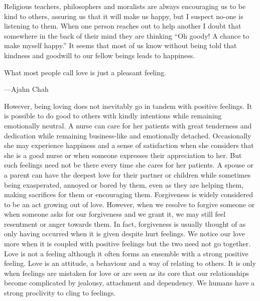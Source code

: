 \documentclass[10pt, openright]{book}
\newenvironment{epigram-2}%
{%
\vspace{1em}
\noindent
\quoting[leftmargin=2.5cm,rightmargin=2.5cm]%
\begin{itshape}
\large
}%
{\end{itshape}\endquoting
}%
\newenvironment{epigram-2-cite}%
{%
\quoting[leftmargin=2.5cm,rightmargin=2.5cm]%
\noindent\normal\hspace*{\fill} 
}%
{\endquoting\vspace{1em}
}%
\begin{document}
Religious teachers, philosophers and moralists are always encouraging us to be kind to others, assuring us that it will make us happy, but I suspect no-one is listening to them. When one person reaches out to help another I doubt that somewhere in the back of their mind they are thinking “Oh goody! A chance to make myself happy.” It seems that most of us know without being told that kindness and goodwill to our fellow beings leads to happiness.


\begin{epigram-2}
What most people call love is just a pleasant feeling.
\end{epigram-2}

\begin{epigram-2-cite}
—Ajahn Chah
\end{epigram-2-cite}

However, being loving does not inevitably go in tandem with positive feelings. It is possible to do good to others with kindly intentions while remaining emotionally neutral. A nurse can care for her patients with great tenderness and dedication while remaining business-like and emotionally detached. Occasionally she may experience happiness and a sense of satisfaction when she considers that she is a good nurse or when someone expresses their appreciation to her. But such feelings need not be there every time she cares for her patients. A spouse or a parent can have the deepest love for their partner or children while sometimes being exasperated, annoyed or bored by them, even as they are helping them, making sacrifices for them or encouraging them. Forgiveness is widely considered to be an act growing out of love. However, when we resolve to forgive someone or when someone asks for our forgiveness and we grant it, we may still feel resentment or anger towards them. In fact, forgiveness is usually thought of as only having occurred when it is given despite hurt feelings. We notice our love more when it is coupled with positive feelings but the two need not go together. Love is not a feeling although it often forms an ensemble with a strong positive feeling. Love is an attitude, a behaviour and a way of relating to others. It is only when feelings are mistaken for love or are seen as its core that our relationships become complicated by jealousy, attachment and dependency. We humans have a strong proclivity to cling to feelings.
\end{document}
